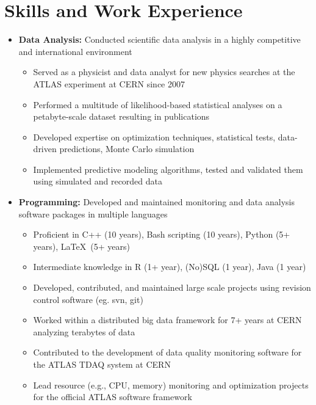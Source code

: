 \documentclass{myfancycv}
\begin{document}
\makeheader

\section{Skills and Work Experience}
\begin{itemize}[leftmargin=14pt,topsep=0pt,parsep=1pt]

\item {\textbf{Data Analysis:} Conducted scientific data analysis in a highly competitive and international environment
{\begin{itemize}[itemindent=-12pt]
	 \item Served as a physicist and data analyst for new physics searches at the ATLAS experiment at CERN since 2007
	 \item Performed a multitude of likelihood-based statistical analyses on a petabyte-scale dataset resulting in publications
	 \item Developed expertise on optimization techniques, statistical tests, data-driven predictions, Monte Carlo simulation
	 \item Implemented predictive modeling algorithms, tested and validated them using simulated and recorded data
\end{itemize}}%
}

\vspace{4pt}

\item {\textbf{Programming:} Developed and maintained monitoring and data analysis software packages in multiple languages
{\begin{itemize}[itemindent=-12pt,topsep=0pt,parsep=0pt]
	\item Proficient in C++ (10 years), Bash scripting (10 years), Python (5+ years), \LaTeX\ (5+ years)
	\item Intermediate knowledge in R (1+ year), (No)SQL (1 year), Java (1 year)
	\item Developed, contributed, and maintained large scale projects using revision control software (eg. svn, git)
	\item Worked within a distributed big data framework for 7+ years at CERN analyzing terabytes of data
	\item Contributed to the development of data quality monitoring software for the ATLAS TDAQ system at CERN
	\item Lead resource (e.g., CPU, memory) monitoring and optimization projects for the official ATLAS software framework
\end{itemize}}%
}


\end{itemize}
\end{document}
